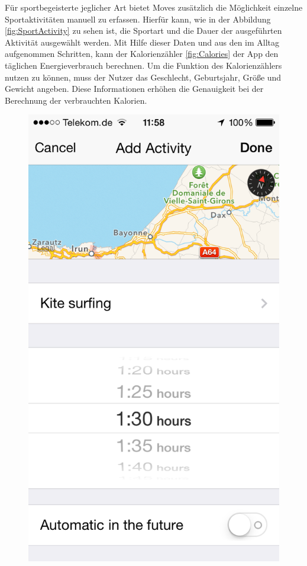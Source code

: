 Für sportbegeisterte jeglicher Art bietet Moves zusätzlich die Möglichkeit einzelne Sportaktivitäten manuell zu erfassen.
Hierfür kann, wie in der Abbildung \ref{fig:SportActivity} zu sehen ist, die Sportart und die Dauer der ausgeführten Aktivität ausgewählt werden.
Mit Hilfe dieser Daten und aus den im Alltag aufgenommen Schritten, kann der Kalorienzähler \ref{fig:Calories} der App den täglichen Energieverbrauch berechnen.
Um die Funktion des Kalorienzählers nutzen zu können, muss der Nutzer das Geschlecht, Geburtsjahr, Größe und Gewicht angeben.
Diese Informationen erhöhen die Genauigkeit bei der Berechnung der verbrauchten Kalorien.
\\
\begin{figure}[H]
  \centering
  \begin{minipage}[t]{0.47\textwidth}
    \centering
    \includegraphics[scale=0.3]{images/moves-app-add-activity.png} 

\end{minipage}
\end{figure}
